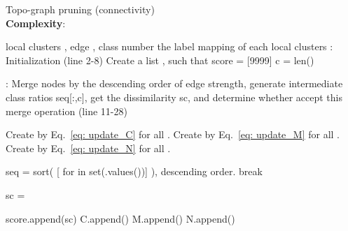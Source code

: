 \documentclass[letterpaper]{article} \usepackage{aaai22}  \usepackage{times}  \usepackage{helvet}  \usepackage{courier}  \usepackage[hyphens]{url}  \usepackage{graphicx} \urlstyle{rm} \def\UrlFont{\rm}  \usepackage{natbib}  \usepackage{caption} \DeclareCaptionStyle{ruled}{labelfont=normalfont,labelsep=colon,strut=off} \frenchspacing  \setlength{\pdfpagewidth}{8.5in}  \setlength{\pdfpageheight}{11in}  \usepackage{subfigure}
\begin{document}
\begin{algorithm}
    \caption{Topo-graph pruning (connectivity)\\
            \textbf{Complexity}: }
    \label{algorithm: topo-graph construction and pruning}
    \begin{algorithmic}[1]
    \Require local clusters , edge , class number 
    \Ensure the label mapping of each local clusters 
        : Initialization (line 2-8)
        \State Create a list , such that  \Comment{{\color{gray}}}
        \State  {}
        \State 
        \State  {}
\State score = [9999] 
        \State c = len()
        
        \State
        : Merge nodes by the descending order of edge strength, generate intermediate class ratios seq[:,c], get the dissimilarity sc, and determine whether accept this merge operation (line 11-28)
            \State 
            \State 
            \State 
            \If{} 
                
                \State 
                \State 
                \State Create  by Eq.~\ref{eq: update_C} for all . \Comment{{\color{gray} }}
                \State Create  by Eq.~\ref{eq: update_M} for all . \Comment{{\color{gray} }}
                \State Create  by Eq.~\ref{eq: update_N} for all . \Comment{{\color{gray} }}
                
                \State seq = sort( [ for  in set(.values())] ), descending order. \Comment{{\color{gray} }}
                \If{}
                    \State break
                \EndIf
                
                \State sc = 
                
                 
                    \State score.append(sc)
                    \State C.append()
                    \State M.append()
                    \State N.append()
                \EndIf
                


                
\EndIf
        \EndFor
    


    
    
\end{algorithmic}
\end{algorithm}
\end{document}
